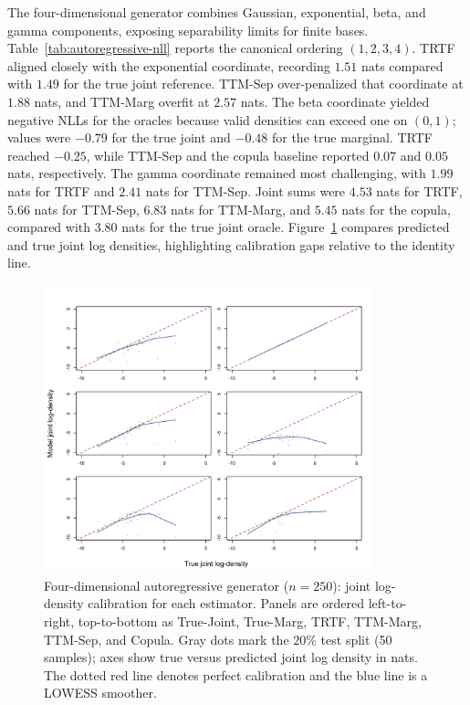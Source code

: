 \documentclass[11pt,a4paper,twoside]{book}\usepackage[]{graphicx}\usepackage[]{xcolor}
\begin{document}
The four-dimensional generator combines Gaussian, exponential, beta, and gamma components, exposing separability limits for finite bases. Table~\ref{tab:autoregressive-nll} reports the canonical ordering $(1,2,3,4)$. TRTF aligned closely with the exponential coordinate, recording $1.51$ nats compared with $1.49$ for the true joint reference. TTM-Sep over-penalized that coordinate at $1.88$ nats, and TTM-Marg overfit at $2.57$ nats. The beta coordinate yielded negative NLLs for the oracles because valid densities can exceed one on $(0,1)$; values were $-0.79$ for the true joint and $-0.48$ for the true marginal. TRTF reached $-0.25$, while TTM-Sep and the copula baseline reported $0.07$ and $0.05$ nats, respectively. The gamma coordinate remained most challenging, with $1.99$ nats for TRTF and $2.41$ nats for TTM-Sep. Joint sums were $4.53$ nats for TRTF, $5.66$ nats for TTM-Sep, $6.83$ nats for TTM-Marg, and $5.45$ nats for the copula, compared with $3.80$ nats for the true joint oracle. Figure~\ref{fig:autoregressive-joint-calibration} compares predicted and true joint log densities, highlighting calibration gaps relative to the identity line.

\begin{figure}[htbp]
  \centering
  \includegraphics[width=0.85\textwidth]{figure/logdensity_joint_N250.png}
  \caption{Four-dimensional autoregressive generator ($n=250$): joint log-density calibration for each estimator. Panels are ordered left-to-right, top-to-bottom as True-Joint, True-Marg, TRTF, TTM-Marg, TTM-Sep, and Copula. Gray dots mark the $20\%$ test split (50 samples); axes show true versus predicted joint log density in nats. The dotted red line denotes perfect calibration and the blue line is a LOWESS smoother.}
  \label{fig:autoregressive-joint-calibration}
\end{figure}
\end{document}
